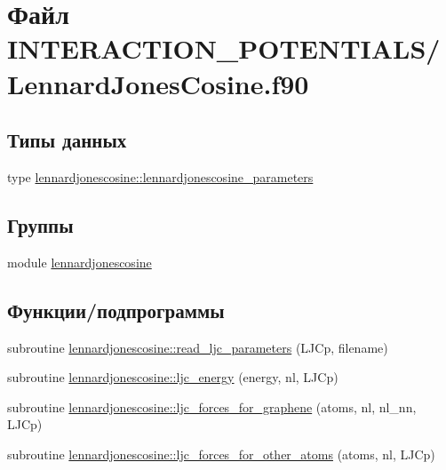 \hypertarget{_lennard_jones_cosine_8f90}{}\section{Файл I\+N\+T\+E\+R\+A\+C\+T\+I\+O\+N\+\_\+\+P\+O\+T\+E\+N\+T\+I\+A\+L\+S/\+Lennard\+Jones\+Cosine.f90}
\label{_lennard_jones_cosine_8f90}
\subsection*{Типы данных}
\begin{DoxyCompactItemize}
\item 
type \mbox{\hyperlink{structlennardjonescosine_1_1lennardjonescosine__parameters}{lennardjonescosine\+::lennardjonescosine\+\_\+parameters}}
\end{DoxyCompactItemize}
\subsection*{Группы}
\begin{DoxyCompactItemize}
\item 
module \mbox{\hyperlink{namespacelennardjonescosine}{lennardjonescosine}}
\end{DoxyCompactItemize}
\subsection*{Функции/подпрограммы}
\begin{DoxyCompactItemize}
\item 
subroutine \mbox{\hyperlink{namespacelennardjonescosine_abdcce4a33286a32fa7d04e2fd1344934}{lennardjonescosine\+::read\+\_\+ljc\+\_\+parameters}} (L\+J\+Cp, filename)
\item 
subroutine \mbox{\hyperlink{namespacelennardjonescosine_a50bfc170eedcf42dd2252426f2476002}{lennardjonescosine\+::ljc\+\_\+energy}} (energy, nl, L\+J\+Cp)
\item 
subroutine \mbox{\hyperlink{namespacelennardjonescosine_aa355c58f69eacc410be4c84a216f9aeb}{lennardjonescosine\+::ljc\+\_\+forces\+\_\+for\+\_\+graphene}} (atoms, nl, nl\+\_\+nn, L\+J\+Cp)
\item 
subroutine \mbox{\hyperlink{namespacelennardjonescosine_a73608f731b0cb701778f6b125e057ab4}{lennardjonescosine\+::ljc\+\_\+forces\+\_\+for\+\_\+other\+\_\+atoms}} (atoms, nl, L\+J\+Cp)
\end{DoxyCompactItemize}
